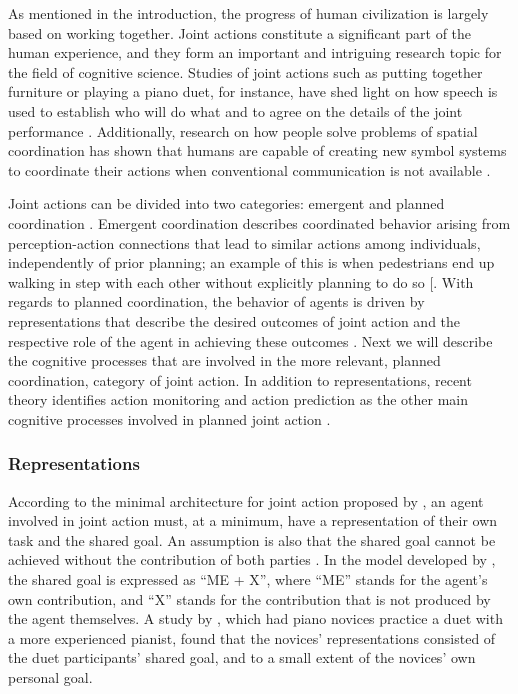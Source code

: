 \documentclass[10pt,a4paper,onecolumn]{article}
\begin{document}
As mentioned in the introduction, the progress of human civilization is largely based on working together. Joint actions constitute a significant part of the human experience, and they form an important and intriguing research topic for the field of cognitive science. Studies of joint actions such as putting together furniture or playing a piano duet, for instance, have shed light on how speech is used to establish who will do what and to agree on the details of the joint performance \autocite{clarkCoordinatingEachOther2005}. Additionally, research on how people solve problems of spatial coordination has shown that humans are capable of creating new symbol systems to coordinate their actions when conventional communication is not available \autocite{galantucciExperimentalSemioticsNew2009}.

Joint actions can be divided into two categories: emergent and planned coordination \autocite{knoblichPsychologicalResearchJoint2011}. Emergent coordination describes coordinated behavior arising from perception-action connections that lead to similar actions among individuals, independently of prior planning; an example of this is when pedestrians end up walking in step with each other without explicitly planning to do so {[}\textcite{knoblichPsychologicalResearchJoint2011}. With regards to planned coordination, the behavior of agents is driven by representations that describe the desired outcomes of joint action and the respective role of the agent in achieving these outcomes \autocite{knoblichPsychologicalResearchJoint2011}. Next we will describe the cognitive processes that are involved in the more relevant, planned coordination, category of joint action. In addition to representations, recent theory identifies action monitoring and action prediction as the other main cognitive processes involved in planned joint action \autocite{loehrMonitoringIndividualJoint2013,sebanzJointActionBodies2006,vesperMinimalArchitectureJoint2010}.

\hypertarget{representations}{%
\subsubsection{Representations}\label{representations}}

According to the minimal architecture for joint action proposed by \textcite{vesperMinimalArchitectureJoint2010}, an agent involved in joint action must, at a minimum, have a representation of their own task and the shared goal. An assumption is also that the shared goal cannot be achieved without the contribution of both parties \autocite{vesperMinimalArchitectureJoint2010}. In the model developed by \textcite{vesperMinimalArchitectureJoint2010}, the shared goal is expressed as ``ME + X'', where ``ME'' stands for the agent's own contribution, and ``X'' stands for the contribution that is not produced by the agent themselves. A study by \textcite{loehrSoundYouMe2016}, which had piano novices practice a duet with a more experienced pianist, found that the novices' representations consisted of the duet participants' shared goal, and to a small extent of the novices' own personal goal.
\end{document}
